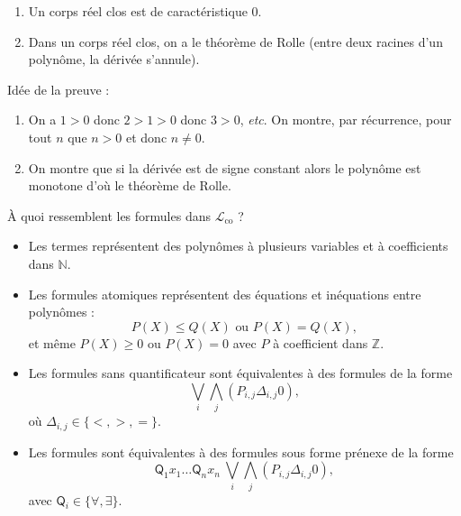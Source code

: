 \documentclass[./main]{subfiles}
\begin{document}
  \begin{prop}
    \begin{enumerate}
      \item Un corps réel clos est de caractéristique $0$.
      \item Dans un corps réel clos, on a le théorème de Rolle (entre deux racines d'un polynôme, la dérivée s'annule).
    \end{enumerate}
  \end{prop}
  \begin{prv}
    Idée de la preuve :
    \begin{enumerate}
      \item On a $1 > 0$ donc  $2 > 1 > 0$ donc $3 > 0$,  \textit{etc}. On montre, par récurrence, pour tout $n$ que  $n > 0$ et donc $n \neq 0$.
      \item On montre que si la dérivée est de signe constant alors le polynôme est monotone d'où le théorème de Rolle.
    \end{enumerate}
  \end{prv}

  À quoi ressemblent les formules dans $\mathcal{L}_\mathrm{co}$ ?

  \begin{itemize}
    \item Les termes représentent des polynômes à plusieurs variables et à coefficients dans $\mathds{N}$.
    \item Les formules atomiques représentent des équations et inéquations entre polynômes :
      \[
      P(X) \le  Q(X) \text{ ou } P(X) = Q(X)
      ,\]
      et même $P(X) \ge 0$ ou $P(X) = 0$ avec  $P$ à coefficient dans $\mathds{Z}$.
    \item Les formules sans quantificateur sont équivalentes à des formules de la forme \[
        \bigvee_i \bigwedge_j (P_{i,j} \mathrel{\Delta_{i,j}} 0) 
      ,\] où $\Delta_{i,j} \in \{<, >, =\}$.
    \item Les formules sont équivalentes à des formules sous forme prénexe de la forme 
      \[
      \mathsf{Q}_1 x_1 \ldots \mathsf{Q}_n x_n \: \bigvee_i \bigwedge_j (P_{i,j} \mathrel{\Delta_{i,j}} 0) 
      ,\] 
      avec $\mathsf{Q}_i \in \{\forall, \exists\}$.
  \end{itemize}
\end{document}
